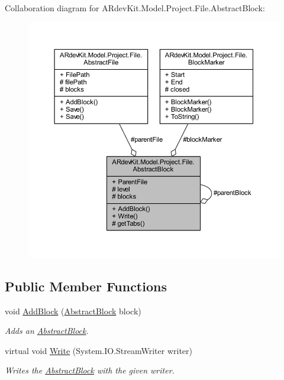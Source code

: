 Collaboration diagram for A\-Rdev\-Kit.\-Model.\-Project.\-File.\-Abstract\-Block\-:
\nopagebreak
\begin{figure}[H]
\begin{center}
\leavevmode
\includegraphics[width=350pt]{class_a_rdev_kit_1_1_model_1_1_project_1_1_file_1_1_abstract_block__coll__graph}
\end{center}
\end{figure}
\subsection*{Public Member Functions}
\begin{DoxyCompactItemize}
\item 
void \hyperlink{class_a_rdev_kit_1_1_model_1_1_project_1_1_file_1_1_abstract_block_aa238e4f3ad33fc75ab3741048ed4dc6b}{Add\-Block} (\hyperlink{class_a_rdev_kit_1_1_model_1_1_project_1_1_file_1_1_abstract_block}{Abstract\-Block} block)
\begin{DoxyCompactList}\small\item\em Adds an \hyperlink{class_a_rdev_kit_1_1_model_1_1_project_1_1_file_1_1_abstract_block}{Abstract\-Block}. \end{DoxyCompactList}\item 
virtual void \hyperlink{class_a_rdev_kit_1_1_model_1_1_project_1_1_file_1_1_abstract_block_a0b27a217de18a766c6647b71c41cc0ea}{Write} (System.\-I\-O.\-Stream\-Writer writer)
\begin{DoxyCompactList}\small\item\em Writes the \hyperlink{class_a_rdev_kit_1_1_model_1_1_project_1_1_file_1_1_abstract_block}{Abstract\-Block} with the given writer. \end{DoxyCompactList}\end{DoxyCompactItemize}
